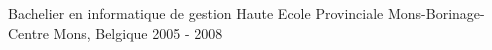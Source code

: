 

\begin{cventries}

  \cventry
    {Bachelier en informatique de gestion} %
    {Haute Ecole Provinciale Mons-Borinage-Centre} %
    {Mons, Belgique} %
    {2005 - 2008} %
    {
    }

\end{cventries}
